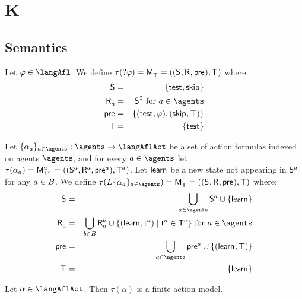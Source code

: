 \section{K}

\subsection{Semantics}

\begin{definition}[Test]\label{afl-k-test}
Let $\phi \in \langAfl$. 
We define $\tau(\test{\phi}) = \aPModel{\aStatesT} = \aPModelTuple{\aStatesT}$ where:
\begin{eqnarray*}
    \aStates &=& \{\aStateTest, \aStateSkip\}\\
    \aAccessibility{\agentA} &=& \aStates^2 \text{ for } \agentA \in \agents\\
    \aPrecondition &=& \{(\aStateTest, \phi), (\aStateSkip, \top)\}\\
    \aStatesT &=& \{\aStateTest\}
\end{eqnarray*}
\end{definition}

\begin{definition}[Learning]\label{afl-k-learning}
Let $\{\alpha_\agentA\}_{\agentA \in \agents} : \agents \to \langAflAct$ be a set of action formulas indexed on agents $\agents$, and for every $\agentA \in \agents$ let $\tau(\alpha_\agentA) = \aPModel[\agentA]{\aStatesT[\agentA]} = \aPModelTuple[\agentA]{\aStatesT[\agentA]}$.
Let $\aStateLearn$ be a new state not appearing in $\aStates[\agentA]$ for any $\agentA \in \agentsB$.
We define $\tau(\learns \{\alpha_\agentA\}_{\agentA \in \agents}) = \aPModel{\aStatesT} = \aPModelTuple{\aStatesT}$ where:
\begin{eqnarray*}
    \aStates &=& \bigcup_{\agentA \in \agents} \aStates[\agentA] \cup \{\aStateLearn\}\\
    \aAccessibility{\agentA} &=& \bigcup_{\agentB \in \agentsB} \aAccessibility[\agentB]{\agentA} \cup \{(\aStateLearn, \aStateT[\agentA]) \mid \aStateT[\agentA] \in \aStatesT[\agentA]\} \text{ for } \agentA \in \agents\\
    \aPrecondition &=& \bigcup_{\agentA \in \agents} \aPrecondition[\agentA] \cup \{(\aStateLearn, \top)\}\\
    \aStatesT &=& \{\aStateLearn\}
\end{eqnarray*}
\end{definition}

\begin{lemma}
Let $\alpha \in \langAflAct$. Then $\tau(\alpha)$ is a finite action model.
\end{lemma}

